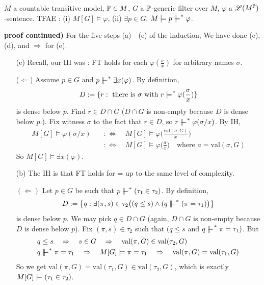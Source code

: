 \documentclass[12pt,a4paper]{article}
\newenvironment{proof}
{\begin{changemargin}{0.5cm}{0.5cm} 
	}%
	{\end{changemargin}
}
\newenvironment{p}
{\begin{proof} 
	}%
	{\end{proof}
}
\begin{document}
 $M$ a countable transitive model, $\mathbb{P} \in M$, $G$ a $\mathbb{P}$-generic filter over $M$, $\varphi$ a $\mathscr{L}(M^{\mathbb{P}})$-sentence. TFAE : (i) $M[G] \models \varphi$, (ii) $\exists p\in G$, $M\models p \forces^* \varphi$. 
\begin{p}
\textbf{proof continued)} For the five steps (a) - (e) of the induction, We have done (c), (d), and $\Rightarrow$ for (e).
\begin{itemize}
\item[(e)] Recall, our IH was : FT holds for each $\varphi(\frac{\sigma}{x})$ for arbitrary names $\sigma$.

($\Leftarrow$) Assume $p\in G$ and $p\forces^* \exists x(\varphi)$. By definition, 
\begin{align*}
D:= \{r:\text{ there is }\sigma\text{ with }r\forces^* \varphi(\frac{\sigma}{x})\}
\end{align*}
is dense below $p$. Find $r\in D\cap G$ ($D\cap G$ is non-empty because $D$ is dense below $p$.). Fix witness $\sigma$ to the fact that $r\in D$, so $r\forces^* \varphi(\sigma/x)$. By IH, 
\begin{align*}
M[G] \models \varphi(\sigma/x) \quad & :\Leftrightarrow \quad M[G] \models \varphi \big(\frac{\text{val}(\sigma, G)}{x} \big) \\
& :\Leftrightarrow \quad M[G] \models \varphi \big(\frac{a}{x} \big) \quad \text{where } a= \text{val}(\sigma, G) 
\end{align*}
So $M[G] \models \exists x(\varphi)$.
\item[(b)] The IH is that FT holds for = up to the same level of complexity.

$(\Leftarrow)$ Let $p\in G$ be such that $p\forces^* (\tau_1 \in \tau_2)$. By definition,
\begin{align*}
D:= \big\{q: \exists (\pi, s) \in \tau_2 \big( (q\leq s) \wedge (q\forces^* ( \pi= \tau_1 ) \big) \big\}
\end{align*}
is dense below $p$. We may pick $q\in D\cap G$ (again, $D\cap G$ is non-empty because $D$ is dense below $p$). Fix $(\pi, s) \in \tau_2$ such that $( q\leq s$ and $q\forces^* \pi=\tau_1)$. But
\begin{align*}
& q\leq s \quad \Rightarrow \quad s\in G \quad \Rightarrow \quad \text{val}(\pi, G) \in \text{val}(\tau_2, G) \\
& q\forces^* \pi=\tau_1 \quad \Rightarrow \quad M[G] \models \pi =\tau_1 \quad \Rightarrow \quad \text{val}(\pi, G) = \text{val}(\tau_1, G)
\end{align*}
So we get $\text{val}(\pi, G) = \text{val}(\tau_1, G)\in \text{val}(\tau_2, G)$, which is exactly $M[G] \forces (\tau_1 \in \tau_2 )$.
\s


\end{itemize}
\end{p}
\end{document}
